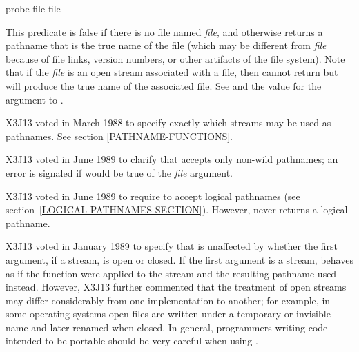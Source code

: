 \begin{defun}[Function]
probe-file file

This predicate is false if there is no file named \emph{file},
and otherwise returns a pathname that is the true name of the file
(which may be different from \emph{file} because of file links, version
numbers, or other artifacts of the file system).
Note that if the \emph{file} is an open stream associated with a file,
then  cannot return {\nil} but will produce the
true name of the associated file.
See  and the  value for the
 argument to .

\begin{new}
X3J13 voted in March 1988
to specify exactly which streams may be used as pathnames.
See section \ref{PATHNAME-FUNCTIONS}.
\end{new}

\begin{newer}
X3J13 voted in June 1989 
to clarify that  accepts only non-wild pathnames;
an error is signaled if  would be true of
the \emph{file} argument.
\end{newer}

\begin{newer}
X3J13 voted in June 1989  to require 
to accept logical pathnames (see section~\ref{LOGICAL-PATHNAMES-SECTION}).
However,  never returns a logical pathname.
\end{newer}

\begin{new}
X3J13 voted in January 1989
to specify that  is unaffected by
whether the first argument, if a stream, is open or closed. If the first
argument is a stream,  behaves as if the function 
were applied to the stream and the resulting pathname used instead.
However, X3J13 further commented that the treatment of open streams
may differ considerably from one implementation to another; for example,
in some operating systems open files are written under a temporary or
invisible name and later renamed when closed.  In general, programmers writing
code intended to be portable should be very careful when using .
\end{new}
\end{defun}

